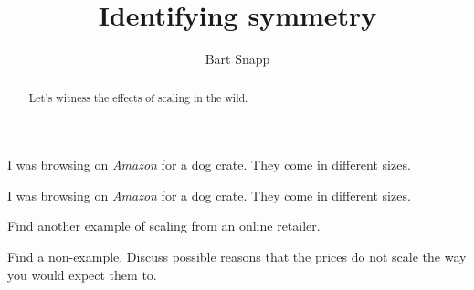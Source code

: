\documentclass[handout,nooutcomes,noauthor]{ximera}
\title{Identifying symmetry}
\author{Bart Snapp}
\begin{document}
\begin{abstract}
  Let's witness the effects of scaling in the wild.
\end{abstract}
\maketitle


\begin{listOutcomes}
\item 
\end{listOutcomes}
I was browsing on \textit{Amazon} for a dog crate. They come in
different sizes.





\mynewpage





\begin{question}
  I was browsing on \textit{Amazon} for a dog crate. They come in
  different sizes.
\end{question}

\mynewpage


\begin{question}
  Find another example of scaling from an online retailer. 
\end{question}

\mynewpage


\begin{question}
  Find a non-example. Discuss possible reasons that the prices do not
  scale the way you would expect them to.
\end{question}
\end{document}
